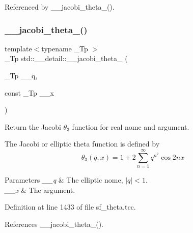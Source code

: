 Referenced by \+\_\+\+\_\+jacobi\+\_\+theta\+\_().

\mbox{\label{namespacestd_1_1____detail_a6a7102085368188062ef47100ce80239}} 
\subsubsection{\texorpdfstring{\+\_\+\+\_\+jacobi\+\_\+theta\+\_()}{\_\_jacobi\_theta\_3()}\hspace{0.1cm}{\footnotesize\ttfamily [2/2]}}
{\footnotesize\ttfamily template$<$typename \+\_\+\+Tp $>$ \\
\+\_\+\+Tp std\+::\+\_\+\+\_\+detail\+::\+\_\+\+\_\+jacobi\+\_\+theta\+\_ (\begin{DoxyParamCaption}\item[{\+\_\+\+Tp}]{\+\_\+\+\_\+q,  }\item[{const \+\_\+\+Tp}]{\+\_\+\+\_\+x }\end{DoxyParamCaption})}

Return the Jacobi $ \theta_3 $ function for real nome and argument.

The Jacobi or elliptic theta function is defined by \[ \theta_3(q,x) = 1 + 2\sum_{n=1}^{\infty} q^{n^2}\cos{2nx} \]


\begin{DoxyParams}{Parameters}
{\em \+\_\+\+\_\+q} & The elliptic nome, $ |q| < 1 $. \\
\hline
{\em \+\_\+\+\_\+x} & The argument. \\
\hline
\end{DoxyParams}


Definition at line 1433 of file sf\+\_\+theta.\+tcc.



References \+\_\+\+\_\+jacobi\+\_\+theta\+\_().

\mbox{\label{namespacestd_1_1____detail_aef15a9b55f5f4ed8b1f6d6113ad0ef12}} 
